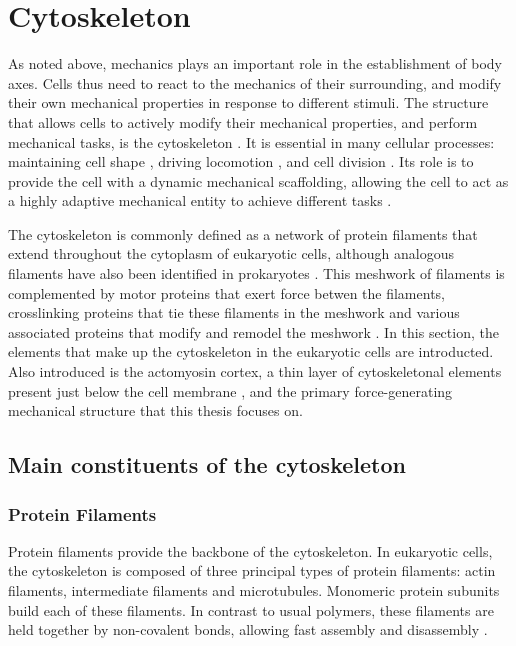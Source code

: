 \section{Cytoskeleton}\label{sec:Cytoskeleton}
As noted above, mechanics plays an important role in the establishment of body axes. Cells thus need to react to the mechanics of their surrounding, and modify their own mechanical properties in response to different stimuli. The structure that allows cells to actively modify their mechanical properties, and perform mechanical tasks, is the cytoskeleton \citep{chaffey2003alberts,bray2001cell,fletcher2010cell}. It is essential in many cellular processes: maintaining cell shape \citep{chaffey2003alberts,rivero1996role,herrmann2007intermediate}, driving locomotion \citep{fletcher2010cell}, and cell division \citep{chaffey2003alberts,gonczy2001spindle}. Its role is to provide the cell with a dynamic mechanical scaffolding, allowing the cell to act as a highly adaptive mechanical entity to achieve different tasks \citep{chaffey2003alberts,bray2001cell,fletcher2010cell}.

The cytoskeleton is commonly defined as a network of protein filaments that extend throughout the cytoplasm of eukaryotic cells, although analogous filaments have also been identified in prokaryotes \citep{erickson2007evolution}. This meshwork of filaments is complemented by motor proteins that exert force betwen the filaments, crosslinking proteins that tie these filaments in the meshwork and various associated proteins that modify and remodel the meshwork \citep{chaffey2003alberts,bray2001cell,fletcher2010cell}. In this section, the elements that make up the cytoskeleton in the eukaryotic cells are introducted. Also introduced is the actomyosin cortex, a thin layer of cytoskeletonal elements present just below the cell membrane \citep{chaffey2003alberts,salbreux2012actin}, and the primary force-generating mechanical structure that this thesis focuses on.

\subsection{Main constituents of the cytoskeleton}\label{subsec:ComponentsCytoskeleton}
\subsubsection{Protein Filaments}\label{subsubsec:FilamentsCytoskeleton}
Protein filaments provide the backbone of the cytoskeleton. In eukaryotic cells, the cytoskeleton is composed of three principal types of protein filaments: actin filaments, intermediate filaments and microtubules. Monomeric protein subunits build each of these filaments. In contrast to usual polymers, these filaments are held together by non-covalent bonds, allowing fast assembly and disassembly \citep{chaffey2003alberts}. 

